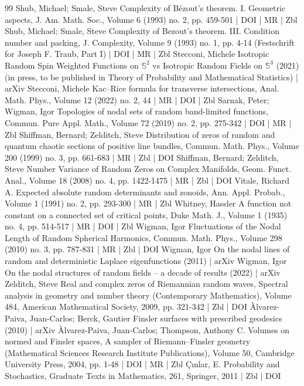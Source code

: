 \documentclass[10pt]{amsart}
\theoremstyle{definition}\newtheorem{defi}[theo]{Definition}\newtheorem{rema}[theo]{Remark}\newtheorem{exam}[theo]{Example}\newtheorem{exem}[theo]{Example}\newtheorem{nota}[theo]{Notation}
\begin{document}
\begin{thebibliography}{99}
Shub, Michael; Smale, Steve Complexity of Bézout’s theorem. I. Geometric aspects, J. Am. Math. Soc., Volume 6 (1993) no. 2, pp. 459-501 | DOI | MR | Zbl
Shub, Michael; Smale, Steve Complexity of Bezout’s theorem. III. Condition number and packing, J. Complexity, Volume 9 (1993) no. 1, pp. 4-14 (Festschrift for Joseph F. Traub, Part I) | DOI | MR | Zbl
Stecconi, Michele Isotropic Random Spin Weighted Functions on $\mathbb{S}^2$ vs Isotropic Random Fields on $\mathbb{S}^3$ (2021) (in press, to be published in Theory of Probability and Mathematical Statistics) | arXiv
Stecconi, Michele Kac–Rice formula for transverse intersections, Anal. Math. Phys., Volume 12 (2022) no. 2, 44 | MR | DOI | Zbl
Sarnak, Peter; Wigman, Igor Topologies of nodal sets of random band-limited functions, Commun. Pure Appl. Math., Volume 72 (2019) no. 2, pp. 275-342 | DOI | MR | Zbl
Shiffman, Bernard; Zelditch, Steve Distribution of zeros of random and quantum chaotic sections of positive line bundles, Commun. Math. Phys., Volume 200 (1999) no. 3, pp. 661-683 | MR | Zbl | DOI
Shiffman, Bernard; Zelditch, Steve Number Variance of Random Zeros on Complex Manifolds, Geom. Funct. Anal., Volume 18 (2008) no. 4, pp. 1422-1475 | MR | Zbl | DOI
Vitale, Richard A. Expected absolute random determinants and zonoids, Ann. Appl. Probab., Volume 1 (1991) no. 2, pp. 293-300 | MR | Zbl
Whitney, Hassler A function not constant on a connected set of critical points, Duke Math. J., Volume 1 (1935) no. 4, pp. 514-517 | MR | DOI | Zbl
Wigman, Igor Fluctuations of the Nodal Length of Random Spherical Harmonics, Commun. Math. Phys., Volume 298 (2010) no. 3, pp. 787-831 | MR | Zbl | DOI
Wigman, Igor On the nodal lines of random and deterministic Laplace eigenfunctions (2011) | arXiv
Wigman, Igor On the nodal structures of random fields – a decade of results (2022) | arXiv
Zelditch, Steve Real and complex zeros of Riemannian random waves, Spectral analysis in geometry and number theory (Contemporary Mathematics), Volume 484, American Mathematical Society, 2009, pp. 321-342 | Zbl | DOI
Àlvarez-Paiva, Juan-Carlos; Berck, Gautier Finsler surfaces with prescribed geodesics (2010) | arXiv
Àlvarez-Paiva, Juan-Carlos; Thompson, Anthony C. Volumes on normed and Finsler spaces, A sampler of Riemann–Finsler geometry (Mathematical Sciences Research Institute Publications), Volume 50, Cambridge University Press, 2004, pp. 1-48 | DOI | MR | Zbl
Çınlar, E. Probability and Stochastics, Graduate Texts in Mathematics, 261, Springer, 2011 | Zbl | DOI
\end{thebibliography}
\end{document}
